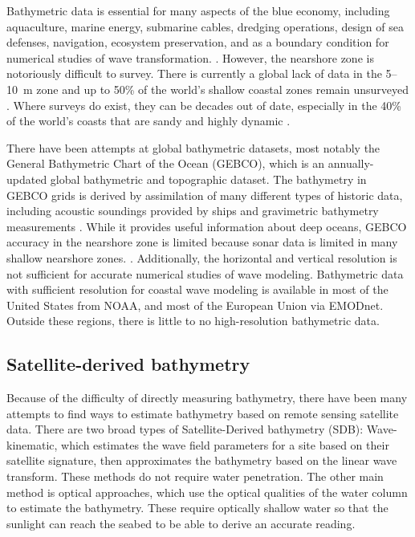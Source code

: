 Bathymetric data is essential for many aspects of the blue economy, including aquaculture, marine energy, submarine cables, dredging operations, design of sea defenses, navigation, ecosystem preservation, and as a boundary condition for numerical studies of wave transformation. \parencite{Cesbron2021,Ashphaq2021}. However, the nearshore zone is notoriously difficult to survey. There is currently a global lack of data in the 5--10~m zone \parencite{Albright2021} and up to 50\% of the world's shallow coastal zones remain unsurveyed \parencite{IHO/OHI2022}. Where surveys do exist, they can be decades out of date, especially in the 40\% of the world's coasts that are sandy and highly dynamic \parencite{Almar2021e}.

There have been attempts at global bathymetric datasets, most notably the General Bathymetric Chart of the Ocean (GEBCO), which is an annually-updated global bathymetric and topographic dataset. The bathymetry in GEBCO grids is derived by assimilation of many different types of historic data, including acoustic soundings provided by ships and gravimetric bathymetry measurements \parencite{Cesbron2021}. While it provides useful information about deep oceans, GEBCO accuracy in the nearshore zone is limited because sonar data is limited in many shallow nearshore zones. \parencite{Monteys2015}. Additionally, the horizontal and vertical resolution is not sufficient for accurate numerical studies of wave modeling. Bathymetric data with sufficient resolution for coastal wave modeling is available in most of the United States from NOAA, and most of the European Union via EMODnet. Outside these regions, there is little to no high-resolution bathymetric data. 

\subsection{Satellite-derived bathymetry}

Because of the difficulty of directly measuring bathymetry, there have been many attempts to find ways to estimate bathymetry based on remote sensing satellite data. There are two broad types of Satellite-Derived bathymetry (SDB): Wave-kinematic, which estimates the wave field parameters for a site based on their satellite signature, then approximates the bathymetry based on the linear wave transform. These methods do not require water penetration. The other main method is optical approaches, which use the optical qualities of the water column to estimate the bathymetry. These require optically shallow water so that the sunlight can reach the seabed to be able to derive an accurate reading. 

